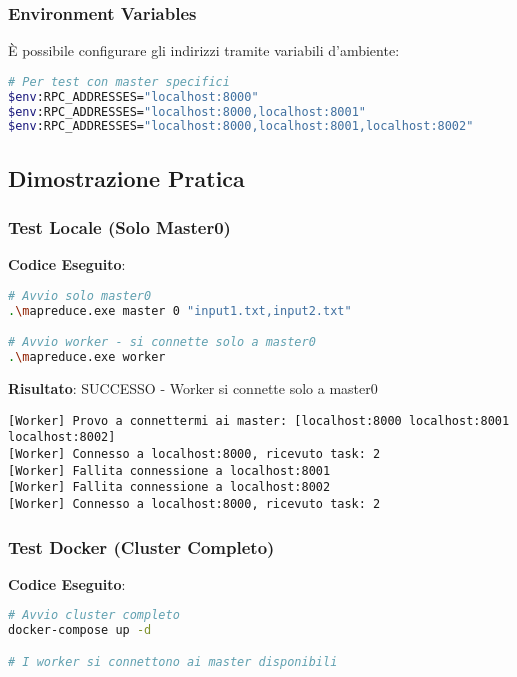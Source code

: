 \documentclass[12pt,a4paper]{article}
\begin{document}
\subsubsection{Environment Variables}

È possibile configurare gli indirizzi tramite variabili d'ambiente:

\begin{lstlisting}[language=bash]
# Per test con master specifici
$env:RPC_ADDRESSES="localhost:8000"
$env:RPC_ADDRESSES="localhost:8000,localhost:8001"
$env:RPC_ADDRESSES="localhost:8000,localhost:8001,localhost:8002"
\end{lstlisting}

\subsection{Dimostrazione Pratica}

\subsubsection{Test Locale (Solo Master0)}

\textbf{Codice Eseguito}:
\begin{lstlisting}[language=bash]
# Avvio solo master0
.\mapreduce.exe master 0 "input1.txt,input2.txt"

# Avvio worker - si connette solo a master0
.\mapreduce.exe worker
\end{lstlisting}

\textbf{Risultato}: SUCCESSO - Worker si connette solo a master0
\begin{lstlisting}
[Worker] Provo a connettermi ai master: [localhost:8000 localhost:8001 localhost:8002]
[Worker] Connesso a localhost:8000, ricevuto task: 2
[Worker] Fallita connessione a localhost:8001
[Worker] Fallita connessione a localhost:8002
[Worker] Connesso a localhost:8000, ricevuto task: 2
\end{lstlisting}

\subsubsection{Test Docker (Cluster Completo)}

\textbf{Codice Eseguito}:
\begin{lstlisting}[language=bash]
# Avvio cluster completo
docker-compose up -d

# I worker si connettono ai master disponibili
\end{lstlisting}
\end{document}
